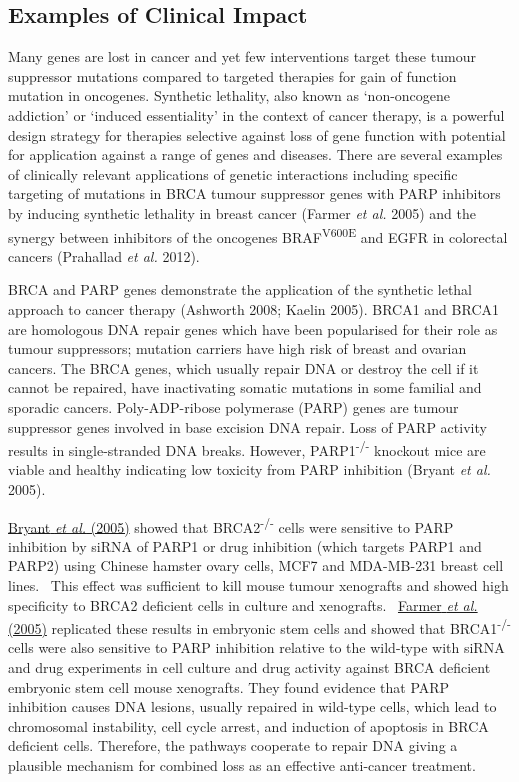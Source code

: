 \subsection[Examples of Clinical Impact]{Examples of Clinical Impact}

Many genes are lost in cancer and yet few interventions target these
tumour suppressor mutations compared to targeted therapies for gain of
function mutation in oncogenes. Synthetic lethality, also known as
{\textquoteleft}non-oncogene addiction{\textquoteright} or
{\textquoteleft}induced essentiality{\textquoteright} in the context of
cancer therapy, is a powerful design strategy for therapies selective
against loss of gene function with potential for application against a
range of genes and diseases. There are several examples of clinically
relevant applications of genetic interactions including specific
targeting of mutations in BRCA tumour suppressor genes with PARP
inhibitors by inducing synthetic lethality in breast cancer
(Farmer\textit{ et al.} 2005) and the synergy between inhibitors of the
oncogenes BRAF\textsuperscript{V600E} and EGFR in colorectal cancers
(Prahallad\textit{ et al.} 2012).


BRCA and PARP genes demonstrate the application of the synthetic lethal
approach to cancer therapy (Ashworth 2008; Kaelin 2005). BRCA1 and
BRCA1 are homologous DNA repair genes which have been popularised for
their role as tumour suppressors; mutation carriers have high risk of
breast and ovarian cancers. The BRCA genes, which usually repair DNA
or destroy the cell if it cannot be repaired, have inactivating somatic
mutations in some familial and sporadic cancers. Poly-ADP-ribose
polymerase (PARP) genes are tumour suppressor genes involved in base
excision DNA repair. Loss of PARP activity results in single-stranded
DNA breaks. However, PARP1\textsuperscript{{}-/-}\textsubscript{
}knockout mice are viable and healthy indicating low toxicity from PARP
inhibition (Bryant\textit{ et al.} 2005). 


\hyperlink{ENREF19}{Bryant}\hyperlink{ENREF19}{\textit{ et
al.}}\hyperlink{ENREF19}{ (2005)} showed that
BRCA2\textsuperscript{{}-/-} cells were sensitive to PARP inhibition by
siRNA of PARP1 or drug inhibition (which targets PARP1 and PARP2) using
Chinese hamster ovary cells, MCF7 and MDA-MB-231 breast cell lines.
\ This effect was sufficient to kill mouse tumour xenografts and showed
high specificity to BRCA2 deficient cells in culture and xenografts.
\ \hyperlink{ENREF39}{Farmer}\hyperlink{ENREF39}{\textit{ et
al.}}\hyperlink{ENREF39}{ (2005)} replicated these results in embryonic
stem cells and showed that BRCA1\textsuperscript{{}-/-} cells were also
sensitive to PARP inhibition relative to the wild-type with siRNA and
drug experiments in cell culture and drug activity against BRCA
deficient embryonic stem cell mouse xenografts. They found evidence
that PARP inhibition causes DNA lesions, usually repaired in wild-type
cells, which lead to chromosomal instability, cell cycle arrest, and
induction of apoptosis in BRCA deficient cells. Therefore, the
pathways cooperate to repair DNA giving a plausible mechanism for
combined loss as an effective anti-cancer treatment. 


